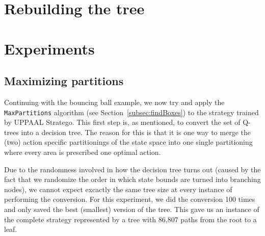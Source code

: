 \documentclass{article}
\begin{document}
\begin{algorithm}[ht]
\begin{algorithmic}[1]

                    \item[]%
                    \EndFor%

                \EndIf%

            \EndFor%
        \EndWhile%


        \EndFunction%
    \end{algorithmic}

\end{algorithm}



\section{Rebuilding the tree}%
\label{sec:rebuildTree}

\lipsum[5]


\section{Experiments}%
\label{sec:experiments}

\subsection{Maximizing partitions}%
\label{subsec:experimentsMaxParts}

Continuing with the bouncing ball example, we now try and apply the
\texttt{MaxPartitions} algorithm (see Section~\ref{subsec:findBoxes}) to the
strategy trained by UPPAAL Stratego.  This first step is, as mentioned, to
convert the set of Q-trees into a decision tree. The reason for this is that it
is one way to merge the (two) action specific partitionings of the state space
into one single partitioning where every area is prescribed one optimal action.

Due to the randomness involved in how the decision tree turns out (caused by the
fact that we randomize the order in which state bounds are turned into branching
nodes), we cannot expect excactly the same tree size at every instance of
performing the conversion. For this experiment, we did the conversion 100 times
and only saved the best (smallest) version of the tree. This gave us an instance
of the complete strategy represented by a tree with 86,807 paths from the root
to a leaf.
\end{document}
